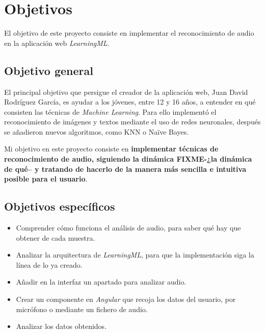 \documentclass[a4paper, 12pt]{book}
\begin{document}
\cleardoublepage %
\chapter{Objetivos} %
\label{chap:objetivos} %

El objetivo de este proyecto consiste en implementar el reconocimiento de audio en la aplicación web \textit{LearningML}.

\section{Objetivo general} %
\label{sec:objetivo-general} %

El principal objetivo que persigue el creador de la aplicación web, Juan David Rodríguez García, es ayudar a los jóvenes, entre 12 y 16 años, a entender en qué consisten las técnicas de \textit{Machine Learning}. Para ello implementó el reconocimiento de imágenes y textos mediante el uso de redes neuronales, después se añadieron nuevos algoritmos, como KNN o Naïve Bayes.

Mi objetivo en este proyecto consiste en {\bf implementar técnicas de reconocimiento de audio, siguiendo la dinámica FIXME-¿la dinámica de qué-- y tratando de hacerlo de la manera más sencilla e intuitiva posible para el usuario}.

\section{Objetivos específicos}
\label{sec:objetivos-especificos}

\begin{itemize}

  \item Comprender cómo funciona el análisis de audio, para saber qué hay que obtener de cada muestra.
  \item Analizar la arquitectura de \textit{LearningML}, para que la implementación siga la línea de lo ya creado.
  \item Añadir en la interfaz un apartado para analizar audio.
  \item Crear un componente en \textit{Angular} que recoja los datos del usuario, por micrófono o mediante un fichero de audio.
  \item Analizar los datos obtenidos.

\end{itemize}
\end{document}
